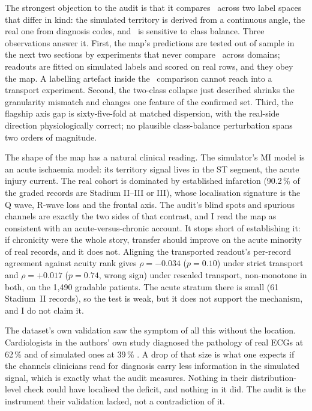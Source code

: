 The strongest objection to the audit is that it compares \etasq\ across two label spaces that differ in kind: the simulated territory is derived from a continuous angle, the real one from diagnosis codes, and \etasq\ is sensitive to class balance. Three observations answer it. First, the map's predictions are tested out of sample in the next two sections by experiments that never compare \etasq\ across domains; readouts are fitted on simulated labels and scored on real rows, and they obey the map. A labelling artefact inside the \etasq\ comparison cannot reach into a transport experiment. Second, the two-class collapse just described shrinks the granularity mismatch and changes one feature of the confirmed set. Third, the flagship axis gap is sixty-five-fold at matched dispersion, with the real-side direction physiologically correct; no plausible class-balance perturbation spans two orders of magnitude. 

The shape of the map has a natural clinical reading. The simulator's MI model is an acute ischaemia model: its territory signal lives in the ST segment, the acute injury current. The real cohort is dominated by established infarction (90.2\,\% of the graded records are Stadium II--III or III), whose localisation signature is the Q wave, R-wave loss and the frontal axis. The audit's blind spots and spurious channels are exactly the two sides of that contrast, and I read the map as consistent with an acute-versus-chronic account. It stops short of establishing it: if chronicity were the whole story, transfer should improve on the acute minority of real records, and it does not. Aligning the transported readout's per-record agreement against acuity rank gives $\rho=-0.034$ ($p=0.10$) under strict transport and $\rho=+0.017$ ($p=0.74$, wrong sign) under rescaled transport, non-monotone in both, on the 1,490 gradable patients. The acute stratum there is small (61 Stadium~II records), so the test is weak, but it does not support the mechanism, and I do not claim it. 

The dataset's own validation saw the symptom of all this without the location. Cardiologists in the authors' own study diagnosed the pathology of real ECGs at 62\,\% and of simulated ones at 39\,\% \citep{gillette2023medalcare}. A drop of that size is what one expects if the channels clinicians read for diagnosis carry less information in the simulated signal, which is exactly what the audit measures. Nothing in their distribution-level check could have localised the deficit, and nothing in it did. The audit is the instrument their validation lacked, not a contradiction of it. 

